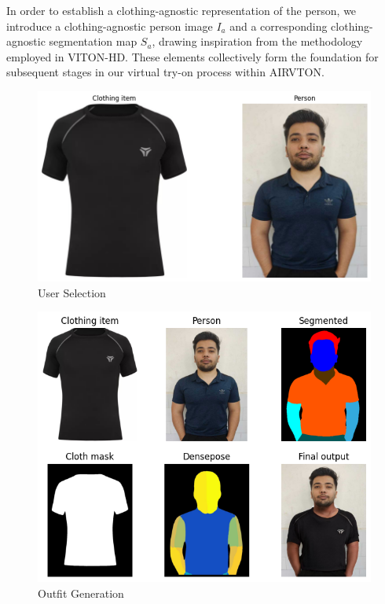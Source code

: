     In order to establish a clothing-agnostic representation of the person, we introduce a clothing-agnostic person image \( I_a \) and a corresponding clothing-agnostic segmentation map \( S_a \), drawing inspiration from the methodology employed in VITON-HD. These elements collectively form the foundation for subsequent stages in our virtual try-on process within AIRVTON.
    \begin{figure}
        \includegraphics[width=\textwidth]{components/images/output1.png}
        \caption{User Selection}
        \label{fig:user-selection}
    \end{figure}
    \begin{figure}
        \includegraphics[width=\textwidth]{components/images/output2.png}
        \caption{Outfit Generation}
        \label{fig:outfit-generation}
    \end{figure}

